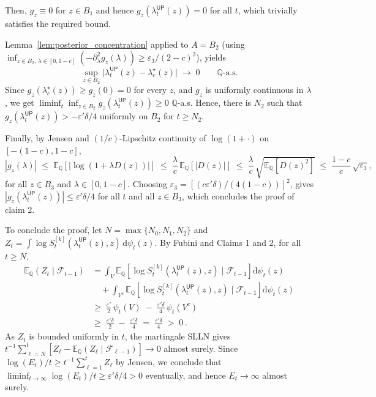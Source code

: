 \documentclass[12pt,twoside]{article}
\theoremstyle{plain}
\theoremstyle{definition}
\theoremstyle{remark}
\newcommand{\calF}{\mathcal{F}}
\newcommand{\Esymb}{\mathbb{E}}
\newcommand{\Qsymb}{\mathbb{Q}}
\newcommand{\Ex}[2]{\Esymb_{{#1}}\left[{#2}\right]}
\newcommand{\fbet}{\lambda}  %
\newcommand{\up}{\mathsf{UP}}
\begin{document}
Then, $g_z\equiv 0$ for $z\in B_1$ and hence $g_z(\fbet_t^\up(z))=0$
for all $t$, which trivially satisfies the required bound.

Lemma~\ref{lem:posterior_concentration}
applied to $A=B_2$ (using $\inf_{z\in B_2,\,\lambda\in[0,1-c]}(-\partial_\lambda^2 g_z(\lambda))
\ge\varepsilon_3/(2-c)^2$), yields
\begin{equation*}
    \sup_{z\in B_2}\bigl|\fbet_t^\up(z)-\fbet^\star_c(z)\bigr|\;\to\;0
    \qquad\Qsymb\text{-a.s.}
\end{equation*}
Since $g_z(\fbet^\star_c(z))\ge g_z(0)=0$ for every $z$, and $g_z$ is uniformly continuous in $\lambda$, we get
$\liminf_{t}\inf_{z\in B_2}g_z(\fbet_t^\up(z))\ge 0$ $\Qsymb$-a.s. Hence,
there is $N_2$ such that $g_z(\fbet_t^\up(z))>-\varepsilon'\delta/4$
uniformly on $B_2$ for $t\ge N_2$.

Finally, by Jensen and $(1/c)$-Lipschitz continuity of $\log(1+\cdot)$ on $[-(1-c),1-c]$,
\begin{equation*}
    |g_z(\lambda)|
    \;\le\;\Ex{\Qsymb}{|\log(1+\lambda D(z))|}
    \;\le\;\frac{\lambda}{c}\,\Ex{\Qsymb}{|D(z)|}
    \;\le\;\frac{\lambda}{c}\,\sqrt{\Ex{\Qsymb}{D(z)^2}}
    \;\le\;\frac{1-c}{c}\,\sqrt{\varepsilon_3},
\end{equation*}
for all $z\in B_3$ and $\lambda\in[0,1-c]$. Choosing $\varepsilon_3 = [{(c\varepsilon'\delta)}/{(4(1-c))}]^2$, gives $|g_z(\fbet_t^\up(z))|\le\varepsilon'\delta/4$
for all $t$ and all $z\in B_3$, which concludes the proof of claim 2.

To conclude the proof, let $N=\max\{N_0,N_1,N_2\}$ and
$Z_t=\int\log S_t^{[k]}(\fbet_t^\up(z),z)\,\mathrm{d}\psi_t(z)$. By Fubini
and Claims 1 and 2, for all $t\ge N$,
\begin{align*}
    \mathbb{E}_\Qsymb(Z_t\mid\calF_{t-1})
    &=\int_V \Ex{\Qsymb}{\log S_t^{[k]}(\fbet_t^\up(z),z)\mid\calF_{t-1}}\mathrm{d}\psi_t(z) \\
    &\quad+\int_{V^c}\Ex{\Qsymb}{\log S_t^{[k]}(\fbet_t^\up(z),z)\mid\calF_{t-1}}\mathrm{d}\psi_t(z) \\
    &\ge\;\tfrac{\varepsilon'}{2}\,\psi_t(V) \;-\; \tfrac{\varepsilon'\delta}{4}\,\psi_t(V^c) \\
    &\ge\;\tfrac{\varepsilon'\delta}{2}\;-\;\tfrac{\varepsilon'\delta}{4}
    \;=\;\tfrac{\varepsilon'\delta}{4}\;>\;0\,.
\end{align*}
As $Z_t$ is bounded uniformly in $t$, the martingale SLLN gives
$t^{-1}\sum_{\ell=N}^t[Z_\ell-\mathbb{E}_\Qsymb(Z_\ell\mid\calF_{\ell-1})]\to0$
almost surely. Since
$\log(E_t)/t\ge t^{-1}\sum_{\ell=1}^t Z_\ell$ by Jensen, we conclude that
$\liminf_{t\to\infty}\log(E_t)/t\ge \varepsilon'\delta/4>0$ eventually, and hence
$E_t\to\infty$ almost surely. 
\end{document}
